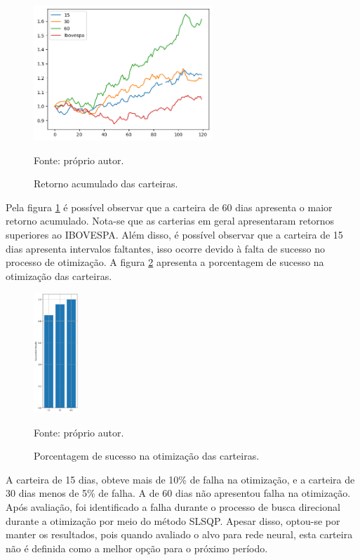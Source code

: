         \begin{figure}[H]
            \centering
            \caption{Retorno acumulado das carteiras.}
            \label{fig:retorno_acumulado}
            \includegraphics[width=0.6\textwidth]{./imagens/retorno_acumulado.png}
            \par \footnotesize Fonte: próprio autor.
        \end{figure}

        \ipar Pela figura \ref{fig:retorno_acumulado} é possível observar que a carteira de 60 dias apresenta o maior retorno acumulado. Nota-se que as carterias em geral apresentaram retornos superiores ao \acrshort{IBOVESPA}. Além disso, é possível observar que a carteira de 15 dias apresenta intervalos faltantes, isso ocorre devido à falta de sucesso no processo de otimização. A figura \ref{fig:success_results} apresenta a porcentagem de sucesso na otimização das carteiras.

        \begin{figure}[H]
            \centering
            \caption{Porcentagem de sucesso na otimização das carteiras.}
            \label{fig:success_results}
            \includegraphics[width=0.15\textwidth]{./imagens/success_results.png}
            \par \footnotesize Fonte: próprio autor.
        \end{figure}

        \ipar A carteira de 15 dias, obteve mais de 10\% de falha na otimização, e a carteira de 30 dias menos de 5\% de falha. A de 60 dias não apresentou falha na otimização. Após avaliação, foi identificado a falha durante o processo de busca direcional durante a otimização por meio do método \acrshort{SLSQP}. Apesar disso, optou-se por manter os resultados, pois quando avaliado o alvo para rede neural, esta carteira não é definida como a melhor opção para o próximo período. 

